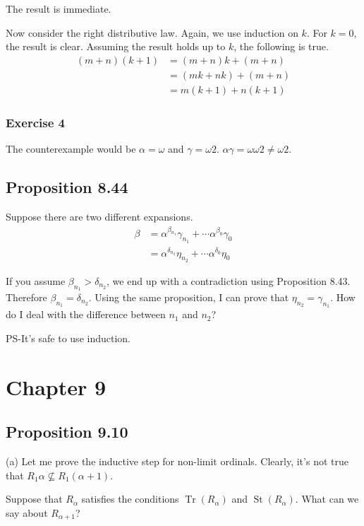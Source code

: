 \documentclass{article}
\DeclareMathOperator{\St}{St}
\DeclareMathOperator{\Tr}{Tr}
\begin{document}
The result is immediate.

Now consider the right distributive law. Again, we use induction on \(k\). For
\(k = 0\), the result is clear. Assuming the result holds up to \(k\), the
following is true.
\begin{align*}
  (m + n)(k + 1) &= (m + n)k + (m + n) \\
    &=(mk + nk) + (m + n) \\
    &=m(k + 1) + n(k + 1)
\end{align*}

\subsubsection{Exercise 4}
The counterexample would be \(\alpha = \omega\) and \(\gamma = \omega 2\).
\(\alpha\gamma = \omega\omega 2 \neq \omega 2\).

\subsection{Proposition 8.44}
Suppose there are two different expansions.
\begin{align*}
  \beta &= \alpha^{\beta_{n_1}} \gamma_{n_1} + \cdots
      \alpha^{\beta_{0}} \gamma_{0} \\
        &= \alpha^{\delta_{n_2}} \eta_{n_2} + \cdots
      \alpha^{\delta_{0}} \eta_{0}
\end{align*}

If you assume \(\beta_{n_1} > \delta_{n_2}\), we end up with a contradiction
using Proposition 8.43. Therefore \(\beta_{n_1} = \delta_{n_2}\). Using the same
proposition, I can prove that \(\eta_{n_2} = \gamma_{n_1}\). How do I deal with
the difference between \(n_1\) and \(n_2\)?

PS-It's safe to use induction.

\section{Chapter 9}
\subsection{Proposition 9.10}
(a) Let me prove the inductive step for non-limit ordinals. Clearly, it's not true
that \(R_1 \alpha \nsubseteq R_1 (\alpha + 1)\).

Suppose that \(R_\alpha\) satisfies the conditions \(\Tr(R_\alpha)\) and
\(\St(R_\alpha)\). What can we say about \(R_{\alpha + 1}\)?
\end{document}
